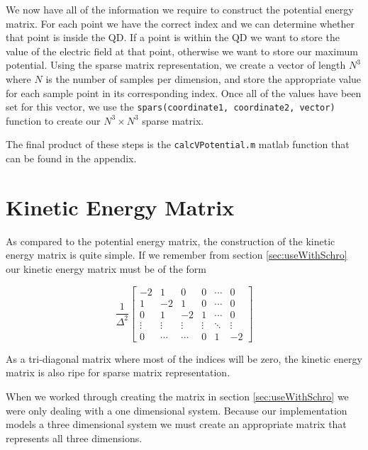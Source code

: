 \documentclass[authoryearcitations]{UoYCSproject}
\begin{document}
We now have all of the information we require to construct the potential energy matrix. For each point we have
the correct index and we can determine whether that point is inside the QD. If a point is within the QD we 
want to store the value of the electric field at that point, otherwise we want to store our maximum potential. 
Using the sparse matrix representation, we create a vector of length $N^3$ where $N$ is the number of samples per
dimension, and
store the appropriate value for each sample point in its corresponding index. Once all of the values have been set
for this vector, we use the \verb+spars(coordinate1, coordinate2, vector)+ function to create our $N^3 \times N^3$
sparse matrix.

The final product of these steps is the \verb+calcVPotential.m+ matlab function that can be found in the appendix. 

\section{Kinetic Energy Matrix}
As compared to the potential energy matrix, the construction of the kinetic energy matrix is quite simple. 
If we remember from section \ref{sec:useWithSchro} our kinetic energy matrix must be of the form

\begin{equation}
\frac{1}{\Delta ^2}\begin{bmatrix}
                -2     &   1    &     0    &     0   & \cdots & 0 \\
                1      &  -2    &     1    &     0   & \cdots & 0 \\
                0      &   1    &    -2    &     1   & \cdots & 0 \\
                \vdots & \vdots &   \vdots & \vdots  & \ddots & \vdots \\
                0      & \cdots &    \cdots     &     0   &    1   & -2
              \end{bmatrix}
\label{eq:kinetic2}
\end{equation}

As a tri-diagonal matrix where most of the indices will be zero, the kinetic energy matrix is also ripe for sparse
matrix representation. 

When we worked through creating the matrix in section \ref{sec:useWithSchro} we were only dealing with a one dimensional
system. Because our implementation models a three dimensional system we must create an appropriate matrix that represents
all three dimensions. 
\end{document}

